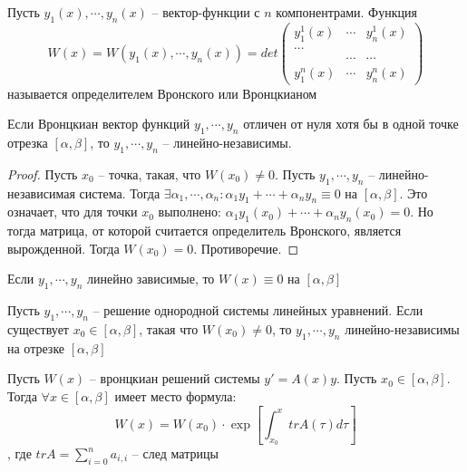 \documentclass[document.tex]{subfiles}
\begin{document}
\begin{definition}
    Пусть $y_1(x), \cdots, y_n(x)$ -- вектор-функции с $n$ компонентрами. Функция
    \[
    W(x) = W(y_1(x), \cdots, y_n(x)) = det
    \left(
        \begin{matrix}
            y_1^1(x) & \cdots & y_n^1(x) \\
            \cdots \\ & \cdots & \cdots \\
            y_1^n(x) & \cdots  & y_n^n(x)
        \end{matrix}
    \right)
    \] называется определителем Вронского или Вронцкианом
\end{definition}

\begin{lemma}
    Если Вронцкиан вектор функций $y_1, \cdots, y_n$ отличен от нуля хотя бы в одной точке отрезка $[\alpha, \beta]$, то
    $y_1, \cdots, y_n$ -- линейно-независимы.
\end{lemma}
\begin{proof}
    Пусть $x_0$ -- точка, такая, что $W(x_0) \neq 0$. Пусть $y_1, \cdots, y_n$ -- линейно-независимая система. Тогда
    $\exists \alpha_1, \cdots, \alpha_n : \alpha_1 y_1 + \cdots + \alpha_n y_n \equiv 0$ на $[\alpha, \beta]$. Это
    означает, что для точки $x_0$ выполнено: $\alpha_1 y_1(x_0) + \cdots + \alpha_n y_n(x_0) = 0$. Но тогда матрица, от
    которой считается определитель Вронского, является вырожденной. Тогда $W(x_0) = 0$. Противоречие.
\end{proof}

\begin{lemma}
    Если $y_1, \cdots, y_n$ линейно зависимые, то $W(x) \equiv 0$ на $[\alpha, \beta]$
\end{lemma}

\begin{theorem}
    Пусть $y_1, \cdots, y_n$ -- решение однородной системы линейных уравнений. Если существует $x_0 \in [\alpha,
    \beta]$, такая что $W(x_0) \neq 0$, то $y_1, \cdots, y_n$ линейно-независимы на отрезке $[\alpha, \beta]$
\end{theorem}

\begin{theorem}
    Пусть $W(x)$ -- вронцкиан решений системы $y' = A(x)y$. Пусть $x_0 \in [\alpha, \beta]$. Тогда $\forall x \in
    [\alpha, \beta]$ имеет место формула:
    \[
        W(x) = W(x_0) \cdot \exp \left[ \int_{x_0}^{x} tr A(\tau) d\tau \right]
    \],
    где $tr A = \sum_{i = 0}^n a_{i, i}$ -- след матрицы
\end{theorem}
\end{document}
